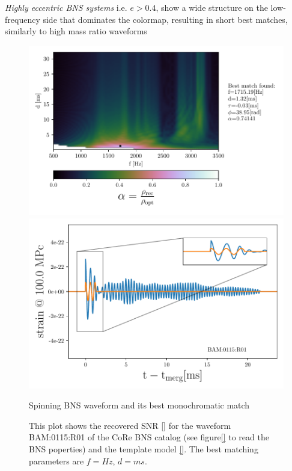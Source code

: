 \FloatBarrier
 

\newpage
\textit{Highly eccentric BNS systems} i.e. $e>0.4$, show a wide structure on the low-frequency side that dominates the colormap, resulting in short best matches, similarly to high mass ratio waveforms


\begin{figure}[!htbp]
\begin{center}
\begin{minipage}[t]{0.5\linewidth}
\vspace{0pt}
\includegraphics[scale=0.6,trim={2mm 0 35mm 0},clip]{images/Data_analysis/results/2D_grid_9.pdf}
\end{minipage}%
\begin{minipage}[t]{0.5\linewidth}
\vspace{20pt}
\includegraphics[scale=0.45]{images/Data_analysis/results/2D_grid_10.pdf}
\end{minipage}
\captionsetup{width=0.8\textwidth}
\caption{Spinning BNS waveform and its best monochromatic match}
\caption*{This plot shows the recovered SNR \ref{} for the waveform BAM:0115:R01 of the CoRe BNS catalog \cite{}(see figure\ref{} to read the BNS poperties) and the template model \ref{}. The best matching parameters are $f=Hz$, $d=ms$.}
\end{center}
\end{figure}

